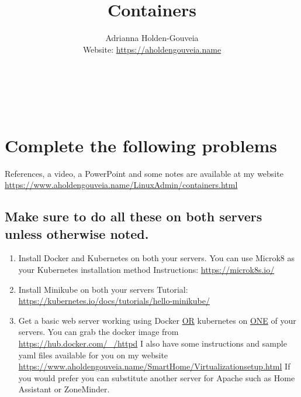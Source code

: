 \documentclass[12pt]{article}
\title{Containers}
\author{
        Adrianna Holden-Gouveia \\
        Website: \url{https://aholdengouveia.name}\\ 
        \date{\vspace{-5ex}}
        \faLinkedin{: aholdengouveia} \\
        \faGithub {: aholdengouveia} \\
        \faTwitter {: aholdengouveia} \\
        }
\begin{document}
    

\maketitle




\section*{Complete the following problems}

References, a video, a PowerPoint and some notes are available at my website
\url {https://www.aholdengouveia.name/LinuxAdmin/containers.html}

\subsection*{Make sure to do all these on both servers unless otherwise noted.}
    \begin{enumerate}
        \item Install Docker and Kubernetes on both your servers.  
            \subitem You can use Microk8 as your Kubernetes installation method  
            \subitem Instructions: \url{https://microk8s.io/}
        \item Install Minikube on both your servers 
            \subitem Tutorial: \url{https://kubernetes.io/docs/tutorials/hello-minikube/}
        \item Get a basic web server working using Docker \underline{OR} kubernetes on \underline{ONE} of your servers. 
            \subitem You can grab the docker image from \url{https://hub.docker.com/_/httpd}  
            \subitem I also have some instructions and sample yaml files available for you on my website \url{https://www.aholdengouveia.name/SmartHome/Virtualizationsetup.html}  
            \subitem If you would prefer you can substitute another server for Apache such as Home Assistant or ZoneMinder.
    \end{enumerate}
\end{document}
